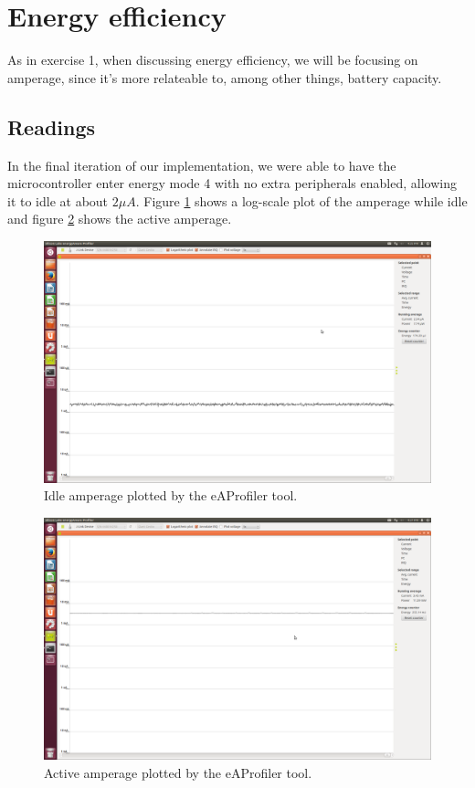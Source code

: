 \section{Energy efficiency}
As in exercise 1, when discussing energy efficiency, we will be focusing on amperage, since it's more relateable to, among other things, battery capacity.

\subsection{Readings}

In the final iteration of our implementation, we were able to have the microcontroller enter energy mode 4 with no extra peripherals enabled, allowing it to idle at about $2\mu A$. Figure \ref{idle-fig} shows a log-scale plot of the amperage while idle and figure \ref{playing-fig} shows the active amperage.

\begin{figure}[h!]
    \includegraphics[width=\linewidth]{img/idle.png}
    \caption{Idle amperage plotted by the eAProfiler tool.}
    \label{idle-fig}
\end{figure}

\begin{figure}[h!]
    \includegraphics[width=\linewidth]{img/playing.png}
    \caption{Active amperage plotted by the eAProfiler tool.}
    \label{playing-fig}
\end{figure}

